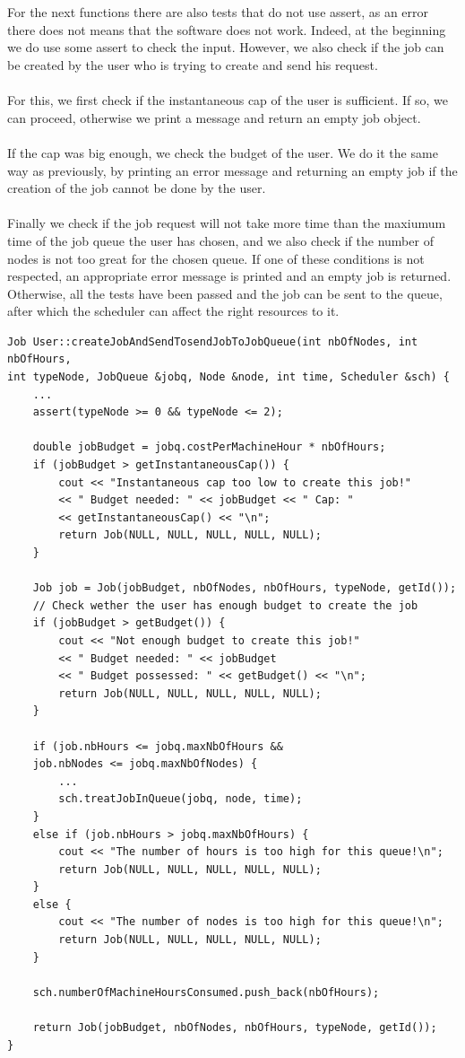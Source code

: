 \documentclass [10 pt, a4 paper]{report}
\begin{document}
\noindent
\\ \\
For the next functions there are also tests that do not use assert, as an error there does not means that the software does not work. Indeed, at the beginning we do use some assert to check the input. However, we also check if the job can be created by the user who is trying to create and send his request. 
\\ \\
\noindent
For this, we first check if the instantaneous cap of the user is sufficient. If so, we can proceed, otherwise we print a message and return an empty job object.
\\ \\
If the cap was big enough, we check the budget of the user. We do it the same way as previously, by printing an error message and returning an empty job if the creation of the job cannot be done by the user.
\\ \\
Finally we check if the job request will not take more time than the maxiumum time of the job queue the user has chosen, and we also check if  the number of nodes is not too great for the chosen queue. If one of these conditions is not respected, an appropriate error message is printed and an empty job is returned. Otherwise, all the tests have been passed and the job can be sent to the queue, after which the scheduler can affect the right resources to it.


\begin{lstlisting}[caption=createJobAndSendTosendJobToJobQueue function of the class User, label={lst:code1}, frame=single]
Job User::createJobAndSendTosendJobToJobQueue(int nbOfNodes, int nbOfHours, 
int typeNode, JobQueue &jobq, Node &node, int time, Scheduler &sch) {
	...
	assert(typeNode >= 0 && typeNode <= 2);

	double jobBudget = jobq.costPerMachineHour * nbOfHours;
	if (jobBudget > getInstantaneousCap()) {
		cout << "Instantaneous cap too low to create this job!" 
		<< " Budget needed: " << jobBudget << " Cap: " 
		<< getInstantaneousCap() << "\n";
		return Job(NULL, NULL, NULL, NULL, NULL);
	}

	Job job = Job(jobBudget, nbOfNodes, nbOfHours, typeNode, getId());
	// Check wether the user has enough budget to create the job
	if (jobBudget > getBudget()) {
		cout << "Not enough budget to create this job!" 
		<< " Budget needed: " << jobBudget 
		<< " Budget possessed: " << getBudget() << "\n";
		return Job(NULL, NULL, NULL, NULL, NULL);
	}
	
	if (job.nbHours <= jobq.maxNbOfHours && 
	job.nbNodes <= jobq.maxNbOfNodes) {
		...
		sch.treatJobInQueue(jobq, node, time);
	}
	else if (job.nbHours > jobq.maxNbOfHours) {
		cout << "The number of hours is too high for this queue!\n";
		return Job(NULL, NULL, NULL, NULL, NULL);
	}
	else {
		cout << "The number of nodes is too high for this queue!\n";
		return Job(NULL, NULL, NULL, NULL, NULL);
	}

	sch.numberOfMachineHoursConsumed.push_back(nbOfHours);

	return Job(jobBudget, nbOfNodes, nbOfHours, typeNode, getId());
}
\end{lstlisting}
\end{document}
